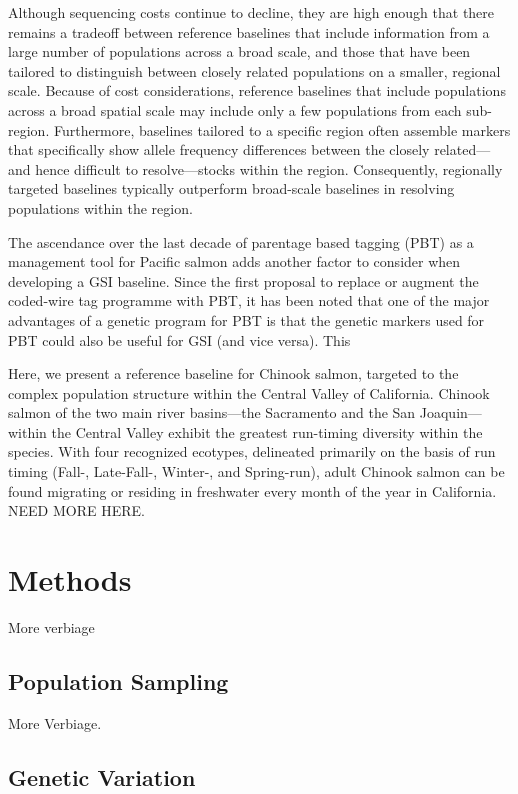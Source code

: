 Although sequencing costs continue to decline, they are high enough
that there remains a tradeoff
between reference baselines that include information from a large number of
populations across a broad scale, and those that have been tailored
to distinguish between closely related populations on a smaller, regional scale.
Because of cost considerations, reference baselines that include populations across a broad 
spatial scale may include only a few populations from each sub-region.  Furthermore,
baselines tailored to a specific region often assemble markers that specifically
show allele frequency differences between the closely related---and hence difficult
to resolve---stocks within the region.  Consequently, regionally targeted baselines typically
outperform broad-scale baselines in resolving populations within the region.

The ascendance over the last decade of parentage based tagging (PBT) as a management
tool for Pacific salmon adds another factor to consider when developing a GSI baseline.
Since the first proposal \citep{anderson2005description} to replace or augment the coded-wire tag
programme \citep{nandor2010overview}
with PBT, it has been noted that one of the major advantages of a genetic program for
PBT is that the genetic markers used for PBT could also be useful for GSI (and
vice versa).  This 

Here, we present a reference baseline for Chinook salmon, targeted to the complex population 
structure within the Central Valley of California. Chinook salmon of the two main river basins---the 
Sacramento and the San Joaquin---within the Central Valley exhibit the greatest run-timing diversity
within the species.  With four recognized ecotypes, delineated primarily on the basis of run timing
(Fall-, Late-Fall-, Winter-, and Spring-run), adult Chinook salmon can be found migrating or residing
in freshwater every month of the year in California. NEED MORE HERE. 


 \section*{Methods}

More verbiage

\subsection*{Population Sampling}

More Verbiage.


\subsection*{Genetic Variation}

